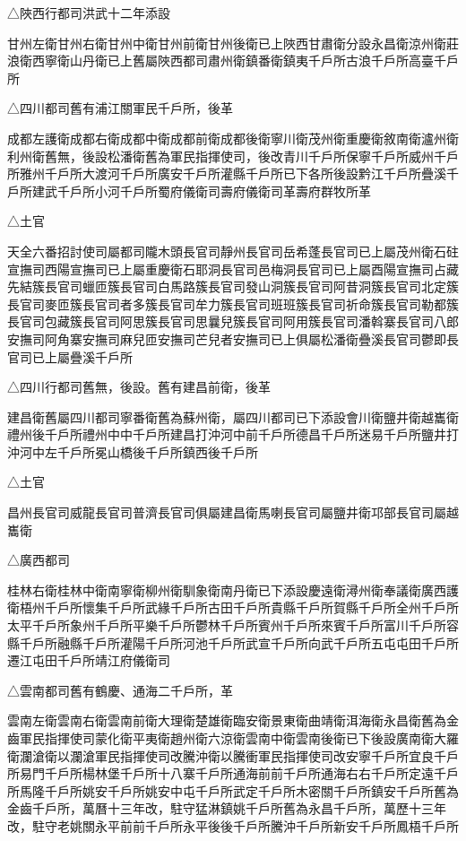 △陜西行都司洪武十二年添設

甘州左衛甘州右衛甘州中衛甘州前衛甘州後衛已上陜西甘肅衛分設永昌衛涼州衛莊浪衛西寧衛山丹衛已上舊屬陜西都司肅州衛鎮番衛鎮夷千戶所古浪千戶所高臺千戶所

△四川都司舊有浦江關軍民千戶所，後革

成都左護衛成都右衛成都中衛成都前衛成都後衛寧川衛茂州衛重慶衛敘南衛瀘州衛利州衛舊無，後設松潘衛舊為軍民指揮使司，後改青川千戶所保寧千戶所威州千戶所雅州千戶所大渡河千戶所廣安千戶所灌縣千戶所已下各所後設黔江千戶所疊溪千戶所建武千戶所小河千戶所蜀府儀衛司壽府儀衛司革壽府群牧所革

△土官

天全六番招討使司屬都司隴木頭長官司靜州長官司岳希蓬長官司已上屬茂州衛石砫宣撫司西陽宣撫司已上屬重慶衛石耶洞長官司邑梅洞長官司已上屬酉陽宣撫司占藏先結簇長官司蠟匝簇長官司白馬路簇長官司發山洞簇長官司阿昔洞簇長官司北定簇長官司麥匝簇長官司者多簇長官司牟力簇長官司班班簇長官司祈命簇長官司勒都簇長官司包藏簇長官司阿思簇長官司思曩兒簇長官司阿用簇長官司潘斡寨長官司八郎安撫司阿角寨安撫司麻兒匝安撫司芒兒者安撫司已上俱屬松潘衛疊溪長官司鬱即長官司已上屬疊溪千戶所

△四川行都司舊無，後設。舊有建昌前衛，後革

建昌衛舊屬四川都司寧番衛舊為蘇州衛，屬四川都司已下添設會川衛鹽井衛越巂衛禮州後千戶所禮州中中千戶所建昌打沖河中前千戶所德昌千戶所迷易千戶所鹽井打沖河中左千戶所冕山橋後千戶所鎮西後千戶所

△土官

昌州長官司威龍長官司普濟長官司俱屬建昌衛馬喇長官司屬鹽井衛邛部長官司屬越巂衛

△廣西都司

桂林右衛桂林中衛南寧衛柳州衛馴象衛南丹衛已下添設慶遠衛潯州衛奉議衛廣西護衛梧州千戶所懷集千戶所武緣千戶所古田千戶所貴縣千戶所賀縣千戶所全州千戶所太平千戶所象州千戶所平樂千戶所鬱林千戶所賓州千戶所來賓千戶所富川千戶所容縣千戶所融縣千戶所灌陽千戶所河池千戶所武宣千戶所向武千戶所五屯屯田千戶所遷江屯田千戶所靖江府儀衛司

△雲南都司舊有鶴慶、通海二千戶所，革

雲南左衛雲南右衛雲南前衛大理衛楚雄衛臨安衛景東衛曲靖衛洱海衛永昌衛舊為金齒軍民指揮使司蒙化衛平夷衛趙州衛六涼衛雲南中衛雲南後衛已下後設廣南衛大羅衛瀾滄衛以瀾滄軍民指揮使司改騰沖衛以騰衝軍民指揮使司改安寧千戶所宜良千戶所易門千戶所楊林堡千戶所十八寨千戶所通海前前千戶所通海右右千戶所定遠千戶所馬隆千戶所姚安千戶所姚安中屯千戶所武定千戶所木密關千戶所鎮安千戶所舊為金齒千戶所，萬曆十三年改，駐守猛淋鎮姚千戶所舊為永昌千戶所，萬歷十三年改，駐守老姚關永平前前千戶所永平後後千戶所騰沖千戶所新安千戶所鳳梧千戶所

